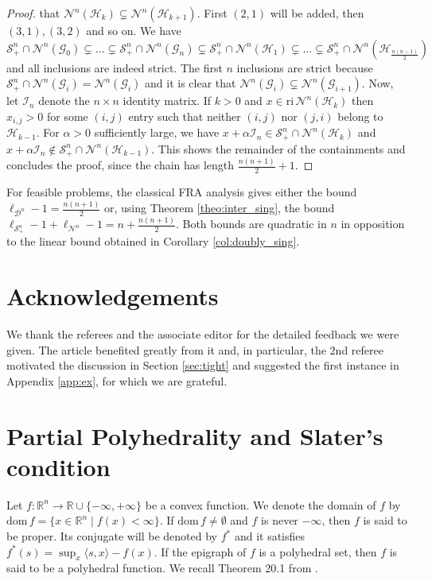 \documentclass{article}
\newcommand{\reInt}{\mathrm{ri}\,}
\newcommand{\inProd}[2]{\langle #1 , #2 \rangle }
\newcommand{\PSDcone}[1]{{\mathcal{S}^{#1}_+}}
\newcommand{\nonNegative}[1]{{\mathcal{N}^{#1}}}
\newcommand{\doubly}[1]{{\mathcal{D}^{#1}}}
\renewcommand{\Re}{\mathbb{R}}
\newcommand{\fDom}{\mathrm{ dom } \,}
\begin{document}
\begin{proof}
that $\nonNegative{n}(\mathcal{H}_k) \subsetneq    \nonNegative{n}(\mathcal{H}_{k+1})$.
First $(2,1)$ will be added, then $(3,1),(3,2)$ and so on.
We have
\begin{equation*}
\PSDcone{n} \cap \nonNegative{n}(\mathcal{G}_0) \subsetneq \ldots 
\subsetneq \PSDcone{n} \cap \nonNegative{n}(\mathcal{G}_n) 
\subsetneq \PSDcone{n} \cap \nonNegative{n}(\mathcal{H}_1) \subsetneq \ldots 
\subsetneq \PSDcone{n} \cap \nonNegative{n}(\mathcal{H}_{\frac{n(n-1)}{2}}) 
\end{equation*}
and all inclusions are indeed strict. The first $n$ inclusions are strict 
because  $ \PSDcone{n} \cap \nonNegative{n}(\mathcal{G}_i) = \nonNegative{n}(\mathcal{G}_i)$ and 
it is clear that $\nonNegative{n}(\mathcal{G}_i) \subsetneq \nonNegative{n}(\mathcal{G}_{i+1})$.
Now, let $\mathcal{I}_n$ denote the $n\times n$ identity matrix.
If $k > 0$ and  $x \in \reInt \nonNegative{n}(\mathcal{H}_k)$ then $x_{i,j} > 0$ for 
some $(i,j)$ entry  such that neither $(i,j)$ nor $(j,i)$ belong to $\mathcal{H}_{k-1} $.
For $\alpha > 0$ sufficiently large, we have $x + \alpha \mathcal{I}_n \in \PSDcone{n} \cap \nonNegative{n}(\mathcal{H}_k) $
and $x + \alpha \mathcal{I}_n \not \in \PSDcone{n} \cap \nonNegative{n}(\mathcal{H}_{k-1}) $. This shows the 
remainder of the containments and concludes the proof, since the chain 
has length $\frac{n(n+1)}{2} + 1$.
\end{proof}

For feasible problems, the classical FRA analysis gives either the bound 
$\ell_{\doubly{n}} - 1 = \frac{n(n+1)}{2} $ or, using Theorem \ref{theo:inter_sing}, 
the bound $\ell_{\PSDcone{n}} - 1 +  \ell_{\nonNegative{n}} - 1 = n + \frac{n(n+1)}{2}$.
Both bounds are quadratic in $n$ in opposition to the linear bound obtained 
in Corollary \ref{col:doubly_sing}.

\small{
	\section*{Acknowledgements}
We thank the referees and the associate editor for the detailed feedback we were given. The article benefited greatly from it and, in particular, 
the 2nd referee motivated the discussion in Section \ref{sec:tight} and suggested the first instance in Appendix \ref{app:ex}, for which we are grateful.
}


\appendix
\section{Partial Polyhedrality and Slater's condition}\label{app:partial}
Let $f:\Re^n \to \Re\cup \{-\infty,+\infty \}$ be a convex function.
We denote the domain of $f$ by $\fDom f = \{x \in \Re^n \mid f(x) < \infty \}$. If $\fDom f \neq \emptyset $ and $f$ is never $-\infty$, then $f$ is said to be proper.
Its conjugate will be denoted by $f^*$ and it satisfies $f^*(s) = \sup _{x} \inProd{s}{x} - f(x)$.
If the epigraph of $f$ is a polyhedral set, then $f$ is said to be a polyhedral function. 
We recall Theorem 20.1 from \cite{rockafellar}.
\end{document}
